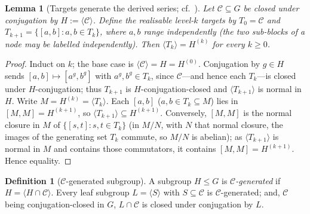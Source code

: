 \documentclass[11pt]{amsart}
\newtheorem{lemma}[lemma]{Lemma}
\theoremstyle{definition}
\newtheorem{definition}[definition]{Definition}
\theoremstyle{remark}
\theoremstyle{plain}
\theoremstyle{plain}
\numberwithin{equation}{section}
\begin{document}
\begin{lemma}[Targets generate the derived series; cf.~\cite{FernandezPintonello2023}]
\label{lem:central}
Let $\mathcal{C}\subseteq G$ be closed under conjugation by $H:=\langle\mathcal{C}\rangle$.
Define the realisable level-$k$ targets by $T_0=\mathcal{C}$ and
$T_{k+1}=\{[a,b]:a,b\in T_k\}$, where $a,b$ range independently (the two
sub-blocks of a node may be labelled independently). Then $\langle T_k\rangle=H^{(k)}$ for every $k\ge0$.
\end{lemma}
\begin{proof}
Induct on $k$; the base case is $\langle\mathcal{C}\rangle=H=H^{(0)}$. Conjugation by
$g\in H$ sends $[a,b]\mapsto[a^g,b^g]$ with $a^g,b^g\in T_k$, since $\mathcal{C}$---and
hence each $T_k$---is closed under $H$-conjugation; thus $T_{k+1}$ is
$H$-conjugation-closed and $\langle T_{k+1}\rangle$ is normal in $H$. Write
$M=H^{(k)}=\langle T_k\rangle$. Each $[a,b]$ ($a,b\in T_k\subseteq M$) lies in
$[M,M]=H^{(k+1)}$, so $\langle T_{k+1}\rangle\subseteq H^{(k+1)}$. Conversely, $[M,M]$ is
the normal closure in $M$ of $\{[s,t]:s,t\in T_k\}$ (in $M/N$, with $N$ that normal
closure, the images of the generating set $T_k$ commute, so $M/N$ is abelian); as
$\langle T_{k+1}\rangle$ is normal in $M$ and contains those commutators, it contains
$[M,M]=H^{(k+1)}$. Hence equality.
\end{proof}

\begin{definition}[$\mathcal{C}$-generated subgroup]
\label{def:cgen}
A subgroup $H\le G$ is \emph{$\mathcal{C}$-generated} if $H=\langle H\cap\mathcal{C}\rangle$.
Every leaf subgroup $L=\langle S\rangle$ with $S\subseteq\mathcal{C}$ is
$\mathcal{C}$-generated; and, $\mathcal{C}$ being conjugation-closed in $G$,
$L\cap\mathcal{C}$ is closed under conjugation by $L$.
\end{definition}
\end{document}
